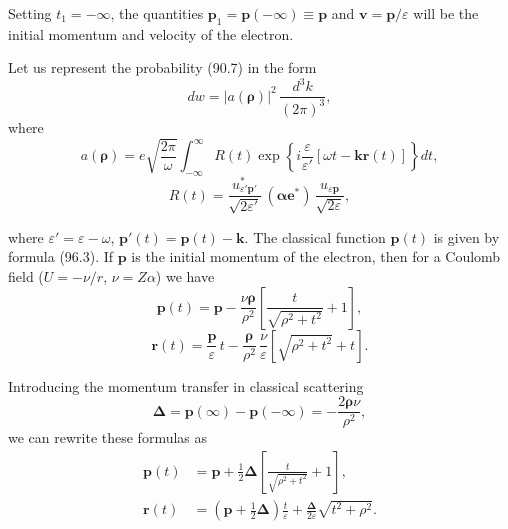 Setting $t_1 = -\infty$, the quantities $\mathbf{p}_1 = \mathbf{p}(-\infty) \equiv \mathbf{p}$ and $\mathbf{v} = \mathbf{p}/\varepsilon$ will be the initial momentum and velocity of the electron.

Let us represent the probability (90.7) in the form
\begin{equation}
dw = |a(\boldsymbol{\rho})|^2\,\frac{d^3k}{(2\pi)^3},
\label{eq:96.5}
\end{equation}
where
\begin{equation}
a(\boldsymbol{\rho}) = e\sqrt{\frac{2\pi}{\omega}}\int_{-\infty}^{\infty}R(t)\exp\!\left\{i\frac{\varepsilon}{\varepsilon'}[\omega t - \mathbf{k}\mathbf{r}(t)]\right\}dt,
\label{eq:96.6}
\end{equation}
\[
R(t) = \frac{u_{\varepsilon'\mathbf{p}'}^*}{\sqrt{2\varepsilon'}}\,(\boldsymbol{\alpha}\mathbf{e}^*)\,\frac{u_{\varepsilon\mathbf{p}}}{\sqrt{2\varepsilon}},
\]


where $\varepsilon' = \varepsilon - \omega$, $\mathbf{p}'(t) = \mathbf{p}(t) - \mathbf{k}$. The classical function $\mathbf{p}(t)$ is given by formula (96.3). If $\mathbf{p}$ is the initial momentum of the electron, then for a Coulomb field ($U = -\nu/r$, $\nu = Z\alpha$) we have
\[
\mathbf{p}(t) = \mathbf{p} - \frac{\nu\boldsymbol{\rho}}{\rho^2}\!\left[\frac{t}{\sqrt{\rho^2 + t^2}} + 1\right],
\]
\[
\mathbf{r}(t) = \frac{\mathbf{p}}{\varepsilon}\,t - \frac{\boldsymbol{\rho}}{\rho^2}\,\frac{\nu}{\varepsilon}\!\left[\sqrt{\rho^2 + t^2} + t\right].
\]

Introducing the momentum transfer in classical scattering
\begin{equation}
\boldsymbol{\Delta} = \mathbf{p}(\infty) - \mathbf{p}(-\infty) = -\frac{2\boldsymbol{\rho}\nu}{\rho^2},
\label{eq:96.7}
\end{equation}
we can rewrite these formulas as
\begin{equation}
\begin{split}
\mathbf{p}(t) &= \mathbf{p} + \frac{1}{2}\boldsymbol{\Delta}\!\left[\frac{t}{\sqrt{\rho^2 + t^2}} + 1\right], \\
\mathbf{r}(t) &= \left(\mathbf{p} + \frac{1}{2}\boldsymbol{\Delta}\right)\frac{t}{\varepsilon} + \frac{\boldsymbol{\Delta}}{2\varepsilon}\sqrt{t^2 + \rho^2}.
\end{split}
\label{eq:96.8}
\end{equation}

